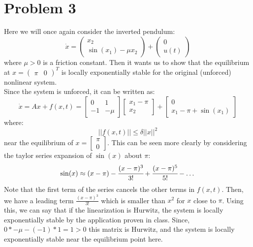 \documentclass{article}
\begin{document}
\section*{Problem 3}
Here we will once again consider the inverted pendulum:
\[\dot{x}=\begin{pmatrix} x_2\\\sin(x_1)-\mu x_2\end{pmatrix}+\begin{pmatrix}0\\ u(t)\end{pmatrix}\]
where $\mu>0$ is a friction constant. Then it wants us to show that the equilibrium at $x=\begin{pmatrix}\pi &0\end{pmatrix}^T$ is locally exponentially stable for the original (unforced) nonlinear system.\\
Since the system is unforced, it can be written as:
\[\dot{x}=Ax+f(x,t)=\begin{bmatrix}0&1\\-1&-\mu\end{bmatrix}\begin{bmatrix}x_1-\pi\\x_2\end{bmatrix}+\begin{bmatrix}0\\x_1-\pi+\sin(x_1)\end{bmatrix}\]
where:
\[\lvert\lvert f(x,t)\rvert\rvert\leq \delta\lvert\lvert x\rvert\rvert^2\]
near the equilibrium of $x=\begin{bmatrix}\pi\\0\end{bmatrix}$. This can be seen more clearly by considering the taylor series expansion of $\sin(x)$ about $\pi$:
\[\sin(x)\approx (x-\pi)-\cfrac{(x-\pi)^3}{3!}+\cfrac{(x-\pi)^5}{5!}-\dots\]
Note that the first term of the series cancels the other terms in $f(x,t)$. Then, we have a leading term $\frac{(x-\pi)^3}{3!}$ which is smaller than $x^2$ for $x$ close to $\pi$. Using this, we can say that if the linearization is Hurwitz, the system is locally exponentially stable by the application proven in class. Since, $0*-\mu-(-1)*1=1>0$ this matrix is Hurwitz, and the system is locally exponentially stable near the equilibrium point here.\\
\end{document}
